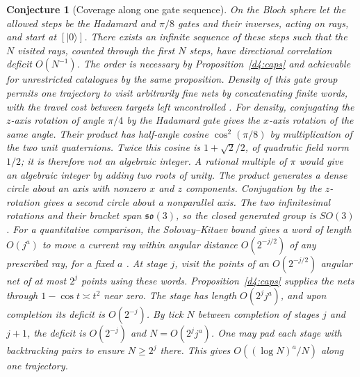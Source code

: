 \documentclass[11pt,reqno]{amsart}
\newtheorem{conjecture}[theorem]{Conjecture}
\theoremstyle{definition}
\theoremstyle{remark}
\numberwithin{equation}{section}
\begin{document}
\begin{conjecture}[Coverage along one gate sequence]\label{d4:conjecture}
On the Bloch sphere let the allowed steps be the Hadamard and
\(\pi/8\) gates and their inverses, acting on rays, and start at
\([|0\rangle]\). There exists an infinite sequence of these steps
such that the \(N\) visited rays, counted through the first \(N\)
steps, have directional correlation deficit \(O(N^{-1})\).
The order is necessary by Proposition~\ref{d4:caps} and
achievable for unrestricted catalogues by the same proposition.
Density of this gate group permits one trajectory to visit
arbitrarily fine nets by concatenating finite words, with the
travel cost between targets left uncontrolled \cite{d4-dawson}.
For density, conjugating the \(z\)-axis rotation of angle \(\pi/4\)
by the Hadamard gate gives the \(x\)-axis rotation of the same angle.
Their product has half-angle cosine \(\cos^2(\pi/8)\) by multiplication
of the two unit quaternions. Twice this cosine is \(1+\sqrt2/2\), of
quadratic field norm \(1/2\); it is therefore not an algebraic
integer. A rational multiple of \(\pi\) would give an algebraic
integer by adding two roots of unity. The product generates a
dense circle about an axis with nonzero \(x\) and \(z\) components.
Conjugation by the \(z\)-rotation gives a second circle about a
nonparallel axis. The two infinitesimal rotations and their bracket
span \(\mathfrak{so}(3)\), so the closed generated group is \(SO(3)\).
For a quantitative comparison, the Solovay--Kitaev bound gives
a word of length \(O(j^a)\) to move a current ray within angular
distance \(O(2^{-j/2})\) of any prescribed ray, for a fixed \(a\)
\cite{d4-dawson}. At stage \(j\), visit the points of an
\(O(2^{-j/2})\) angular net of at most \(2^j\) points using these
words. Proposition~\ref{d4:caps} supplies the nets through
\(1-\cos t\asymp t^2\) near zero. The stage has length
\(O(2^j j^a)\), and upon completion its deficit is \(O(2^{-j})\).
By tick \(N\) between completion of stages \(j\) and \(j+1\), the
deficit is \(O(2^{-j})\) and \(N=O(2^j j^a)\). One may pad each
stage with backtracking pairs to ensure \(N\ge2^j\) there.
This gives \(O((\log N)^a/N)\) along one trajectory.
\end{conjecture}
\end{document}
